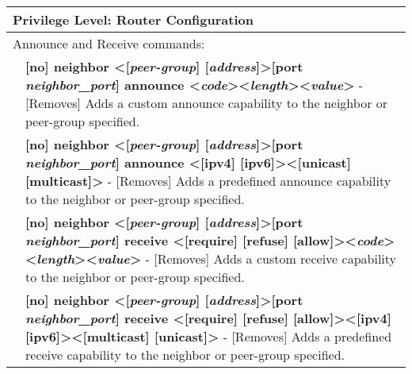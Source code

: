 \newpage
\begin{tabular}{|p{10pt}p{400pt}|}
\hline

\multicolumn{2}{|l|}{{\bf Privilege Level:} Router Configuration }\\ 

\hline

\multicolumn{2}{|l|}{Announce and Receive commands:}\\ 

\hline

& {\bf \small [no] neighbor \textless[\emph{peer-group}] [\emph{address}]\textgreater [port \emph{neighbor\_port}] announce \textless\emph{code}\textgreater \textless\emph{length}\textgreater \textless\emph{value}\textgreater} - [Removes] Adds a custom announce capability to the neighbor or peer-group specified.\\[4pt]

& {\bf \small [no] neighbor \textless[\emph{peer-group}] [\emph{address}]\textgreater [port \emph{neighbor\_port}] announce \textless[ipv4] [ipv6]\textgreater \textless[unicast] [multicast]\textgreater} - [Removes] Adds a predefined announce capability to the neighbor or peer-group specified. \\[4pt]

& {\bf \small [no] neighbor \textless[\emph{peer-group}] [\emph{address}]\textgreater [port \emph{neighbor\_port}] receive \textless[require] [refuse] [allow]\textgreater \textless\emph{code}\textgreater \textless\emph{length}\textgreater \textless\emph{value}\textgreater} - [Removes] Adds a custom receive capability to the neighbor or peer-group specified. \\[4pt]

& {\bf \small [no] neighbor \textless[\emph{peer-group}] [\emph{address}]\textgreater [port \emph{neighbor\_port}] receive \textless[require] [refuse] [allow]\textgreater \textless[ipv4] [ipv6]\textgreater \textless[multicast] [unicast]\textgreater} - [Removes] Adds a predefined receive capability to the neighbor or peer-group specified. \\[4pt]



\end{tabular}
